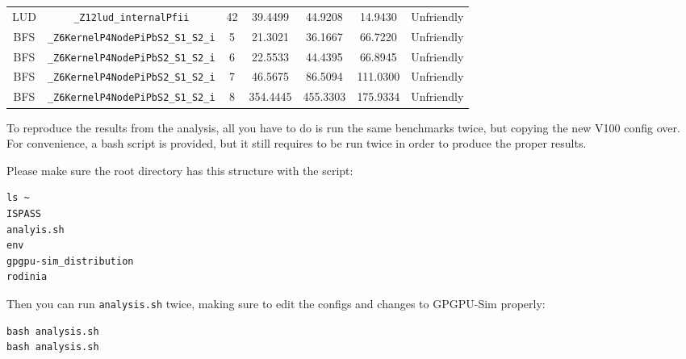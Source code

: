 \documentclass{article}
\begin{document}
\begin{table}[H]
\begin{tabular}{c c c c c c c}
		LUD       & \verb|_Z12lud_internalPfii|          & 42  & 39.4499  & 44.9208       & 14.9430        & Unfriendly \\
		BFS       & \verb|_Z6KernelP4NodePiPbS2_S1_S2_i| & 5   & 21.3021  & 36.1667       & 66.7220        & Unfriendly \\
		BFS       & \verb|_Z6KernelP4NodePiPbS2_S1_S2_i| & 6   & 22.5533  & 44.4395       & 66.8945        & Unfriendly \\
		BFS       & \verb|_Z6KernelP4NodePiPbS2_S1_S2_i| & 7   & 46.5675  & 86.5094       & 111.0300       & Unfriendly \\
		BFS       & \verb|_Z6KernelP4NodePiPbS2_S1_S2_i| & 8   & 354.4445 & 455.3303      & 175.9334       & Unfriendly \\
		[1ex] %
		\hline %
	\end{tabular}
	\label{table:cache-unfriendly} %
\end{table}

To reproduce the results from the analysis, all you have to do is run the same benchmarks twice, but copying the new V100 config over. For convenience, a bash script is provided, but it still requires to be run twice in order to produce the proper results.

Please make sure the root directory has this structure with the script:
\begin{verbatim}
ls ~
ISPASS  
analyis.sh  
env  
gpgpu-sim_distribution  
rodinia
\end{verbatim}

Then you can run \verb|analysis.sh| twice, making sure to edit the configs and changes to GPGPU-Sim properly:
\begin{verbatim}
bash analysis.sh
bash analysis.sh
\end{verbatim}
\end{document}
